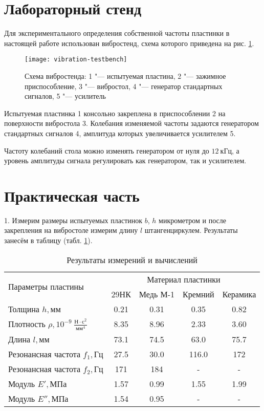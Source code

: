 \section{Лабораторный стенд}
Для экспериментального определения собственной частоты пластинки в настоящей работе использован вибростенд, схема которого приведена на рис. \ref{fig:vibration-testbench}.

\begin{figure}[!ht]
    \centering
    \texttt{[image: vibration-testbench]}
    \caption{Схема вибростенда: 1 "--- испытуемая пластина, 2 "--- зажимное приспособление, 3 "--- вибростол, 4 "--- генератор стандартных сигналов, 5 "--- усилитель}
    \label{fig:vibration-testbench}
\end{figure}

Испытуемая пластинка 1 консольно закреплена в приспособлении 2 на поверхности вибростола 3.
Колебания изменяемой частоты задаются генератором стандартных сигналов 4, амплитуда которых увеличивается усилителем 5.

Частоту колебаний стола можно изменять генератором от нуля до $12 ~кГц$, а уровень амплитуды сигнала регулировать как генератором, так и усилителем.

\section{Практическая часть}
1. Измерим размеры испытуемых пластинок $b$, $h$ микрометром и после закрепления на вибростоле измерим длину $l$ штангенциркулем.
Результаты занесём в таблицу (табл. \ref{tab:results}).

\begin{table}[H]
    \centering
    \caption{Результаты измерений и вычислений}
    \label{tab:results}
    \begin{tabular}{|l|c|c|c|c|}
        \hline
        \multirow{2}{*}{Параметры пластины}               & \multicolumn{4}{c|}{Материал пластинки} \\ \cline{2-5}
                                                          & 29НК & Медь М-1 & Кремний & Керамика \\ \hline
        Толщина $h, мм$                                   & 0.21 & 0.31 & 0.35  & 0.82 \\ \hline
        Плотность $\rho, 10^{-9}~\frac{Н \cdot с^2}{мм^4} $ & 8.35 & 8.96 & 2.33  & 3.60 \\ \hline
        Длина $l, мм$                                     & 73.1 & 74.5 & 63.0  & 75.7 \\ \hline
        Резонансная частота $f_1, Гц$                     & 27.5 & 30.0 & 116.0 & 172  \\ \hline
        Резонансная частота $f_2, Гц$                     & 171  & 184  & -     & -    \\ \hline
        Модуль $E', МПа$                                  & 1.57 & 0.99 & 1.55  & 1.99 \\ \hline
        Модуль $E'', МПа$                                 & 1.54 & 0.95 & -     & -    \\ \hline
    \end{tabular}
\end{table}

